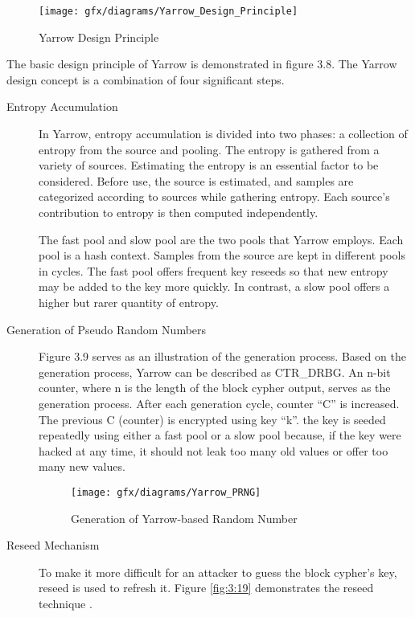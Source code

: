 \begin{figure}[!h]
	\centering
	\texttt{[image: gfx/diagrams/Yarrow\_Design\_Principle]}
	\caption{Yarrow Design Principle \cite{YI-2002}}
	\label{fig:3:9}
\end{figure}

The basic design principle of Yarrow is demonstrated in figure 3.8. The Yarrow design concept is a combination of four significant steps.

\begin{description}
	\item[Entropy Accumulation] In Yarrow, entropy accumulation is divided into two phases: a collection of entropy from the source and pooling. The entropy is gathered from a variety of sources. Estimating the entropy is an essential factor to be considered. Before use, the source is estimated, and samples are categorized according to sources while gathering entropy. Each source’s contribution to entropy is then computed independently.
	
	The fast pool and slow pool are the two pools that Yarrow employs. Each pool is a hash context. Samples from the source are kept in different pools in cycles. The fast pool offers frequent key reseeds so that new entropy may be added to the key more quickly. In contrast, a slow pool offers a higher but rarer quantity of entropy.
	
	\item[Generation of Pseudo Random Numbers] Figure 3.9 \cite{YR-1999} serves as an illustration of the generation process. Based on the generation process, Yarrow can be described as CTR\_DRBG. An n-bit counter, where n is the length of the block cypher output, serves as the generation process. After each generation cycle, counter “C” is increased. The previous C (counter) is encrypted using key “k”. the key is seeded repeatedly using either a fast pool or a slow pool because, if the key were hacked at any time, it should not leak too many old values or offer too many new values.
	\begin{figure}[!h]
		\centering
		\texttt{[image: gfx/diagrams/Yarrow\_PRNG]}
		\caption{Generation of Yarrow-based Random Number}
		\label{fig:3:10}
	\end{figure}
	
	\item[Reseed Mechanism] To make it more difficult for an attacker to guess the block cypher’s key, reseed is used to refresh it. Figure \ref{fig:3:19} demonstrates the reseed technique  \cite{YI-2002}.
	

\end{description}
